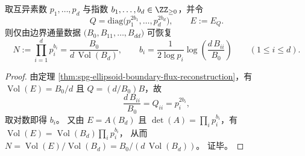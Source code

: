 

\begin{corollary}\label{cor:spg-godel-axis-boundary-invertibility}
取互异素数 \(p_1,\dots,p_d\) 与指数 \(b_1,\dots,b_d\in\ZZ_{\ge 0}\)，并令
\[
Q=\mathrm{diag}\bigl(p_1^{2b_1},\dots,p_d^{2b_d}\bigr),
\qquad
E:=E_Q.
\]
则仅由边界通量数据 \(\bigl(B_0,B_{11},\dots,B_{dd}\bigr)\) 可恢复
\[
N:=\prod_{i=1}^d p_i^{b_i}=\frac{B_0}{d\,\operatorname{Vol}(B_d)},
\qquad
b_i=\frac{1}{2\log p_i}\log\!\left(\frac{d\,B_{ii}}{B_0}\right)\qquad(1\le i\le d).
\]
\end{corollary}
\begin{proof}
由定理 \ref{thm:spg-ellipsoid-boundary-flux-reconstruction}，有 \(\operatorname{Vol}(E)=B_0/d\) 且 \(Q=(d/B_0)B\)，故
\[
\frac{d\,B_{ii}}{B_0}=Q_{ii}=p_i^{2b_i},
\]
取对数即得 \(b_i\)。
又由 \(E=A(B_d)\) 且 \(\det(A)=\prod_i p_i^{b_i}\)，有
\(
\operatorname{Vol}(E)=\operatorname{Vol}(B_d)\prod_i p_i^{b_i}
\)，
从而
\(
N=\operatorname{Vol}(E)/\operatorname{Vol}(B_d)=B_0/(d\,\operatorname{Vol}(B_d))
\)。
证毕。
\end{proof}

